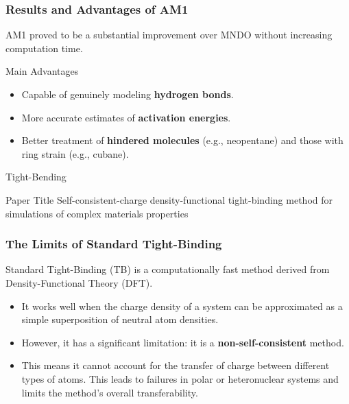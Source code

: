 \begin{frame}
  \frametitle{Results and Advantages of AM1}
  
  AM1 proved to be a substantial improvement over MNDO without increasing computation time. \pause
  
  \begin{alertblock}{Main Advantages}
    \begin{itemize}
      \item<2-> Capable of genuinely modeling \textbf{hydrogen bonds}. \pause
      \item<3-> More accurate estimates of \textbf{activation energies}. \pause
      \item<4-> Better treatment of \textbf{hindered molecules} (e.g., neopentane) and those with ring strain (e.g., cubane).
    \end{itemize}
  \end{alertblock}
  
\end{frame}


\begin{frame}{Tight-Bending}
	\begin{block}{Paper Title}
	Self-consistent-charge density-functional tight-binding method for simulations of complex
materials properties
	\end{block}
\end{frame}

\begin{frame}
  \frametitle{The Limits of Standard Tight-Binding}
  
  Standard Tight-Binding (TB) is a computationally fast method derived from Density-Functional Theory (DFT). \pause
  
  \begin{itemize}
    \item It works well when the charge density of a system can be approximated as a simple superposition of neutral atom densities. \pause
    
    \item However, it has a significant limitation: it is a \textbf{non-self-consistent} method. \pause
    
    \item This means it cannot account for the transfer of charge between different types of atoms. This leads to failures in polar or heteronuclear systems and limits the method's overall transferability.
  \end{itemize}
\end{frame}

